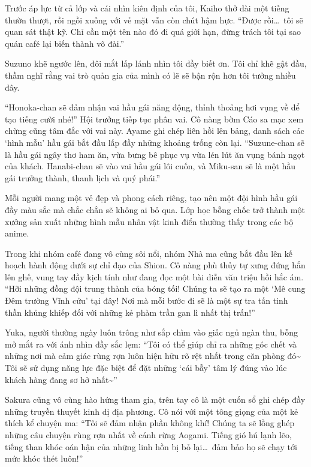 \documentclass[../main.tex]{subfiles}
\begin{document}
Trước áp lực từ cả lớp và cái nhìn kiên định của tôi, Kaiho thở dài một tiếng thườn thượt, rồi ngồi xuống với vẻ mặt vẫn còn chút hậm hực. ``Được rồi\dots\ tôi sẽ quan sát thật kỹ. Chỉ cần một tên nào đó đi quá giới hạn, đừng trách tôi tại sao quán café lại biến thành võ đài.''

Suzuno khẽ ngước lên, đôi mắt lấp lánh nhìn tôi đầy biết ơn. Tôi chỉ khẽ gật đầu, thầm nghĩ rằng vai trò quản gia của mình có lẽ sẽ bận rộn hơn tôi tưởng nhiều đây.

``Honoka-chan sẽ đảm nhận vai hầu gái năng động, thỉnh thoảng hơi vụng về để tạo tiếng cười nhé!'' Hội trưởng tiếp tục phân vai. Cô nàng bờm Cáo sa mạc xem chừng cũng tâm đắc với vai này. Ayame ghi chép liên hồi lên bảng, danh sách các `hình mẫu' hầu gái bắt đầu lấp đầy những khoảng trống còn lại. ``Suzune-chan sẽ là hầu gái ngây thơ ham ăn, vừa bưng bê phục vụ vừa lén lút ăn vụng bánh ngọt của khách. Hanabi-chan sẽ vào vai hầu gái lôi cuốn, và Miku-san sẽ là một hầu gái trưởng thành, thanh lịch và quý phái.''

Mỗi người mang một vẻ đẹp và phong cách riêng, tạo nên một đội hình hầu gái đầy màu sắc mà chắc chắn sẽ không ai bỏ qua. Lớp học bỗng chốc trở thành một xưởng sản xuất những hình mẫu nhân vật kinh điển thường thấy trong các bộ anime.

Trong khi nhóm café đang vô cùng sôi nổi, nhóm Nhà ma cũng bắt đầu lên kế hoạch hành động dưới sự chỉ đạo của Shion. Cô nàng phù thủy tự xưng đứng hẳn lên ghế, vung tay đầy kịch tính như đang đọc một bài diễn văn triệu hồi hắc ám. ``Hỡi những đồng đội trung thành của bóng tối! Chúng ta sẽ tạo ra một `Mê cung Đêm trường Vĩnh cửu' tại đây! Nơi mà mỗi bước đi sẽ là một sự tra tấn tinh thần khủng khiếp đối với những kẻ phàm trần gan lì nhất thị trấn!''

Yuka, người thường ngày luôn trông như sắp chìm vào giấc ngủ ngàn thu, bỗng mở mắt ra với ánh nhìn đầy sắc lẹm: ``Tôi có thể giúp chỉ ra những góc chết và những nơi mà cảm giác rùng rợn luôn hiện hữu rõ rệt nhất trong căn phòng đó\~{} Tôi sẽ sử dụng năng lực đặc biệt để đặt những `cái bẫy' tâm lý đúng vào lúc khách hàng đang sơ hở nhất\~{}''

Sakura cũng vô cùng hào hứng tham gia, trên tay cô là một cuốn sổ ghi chép đầy những truyền thuyết kinh dị địa phương. Cô nói với một tông giọng của một kẻ thích kể chuyện ma: ``Tôi sẽ đảm nhận phần không khí! Chúng ta sẽ lồng ghép những câu chuyện rùng rợn nhất về cánh rừng Aogami. Tiếng gió hú lạnh lẽo, tiếng than khóc oán hận của những linh hồn bị bỏ lại\dots\ đảm bảo họ sẽ chạy tới mức khóc thét luôn!''
\end{document}
